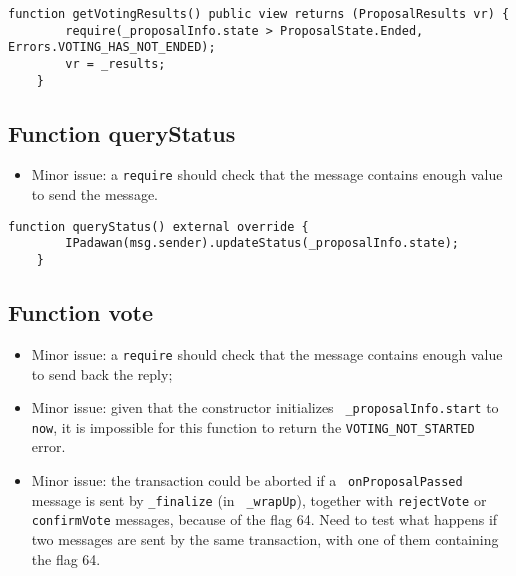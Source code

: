 \begin{lstlisting}[firstnumber=172]
    function getVotingResults() public view returns (ProposalResults vr) {
        require(_proposalInfo.state > ProposalState.Ended, Errors.VOTING_HAS_NOT_ENDED);
        vr = _results;
    }
\end{lstlisting}

\subsection{Function queryStatus}

\begin{itemize}
\item Minor issue: a {\tt require} should check that the message
  contains enough value to send the message.
\end{itemize}

\begin{lstlisting}[firstnumber=162]
    function queryStatus() external override {
        IPadawan(msg.sender).updateStatus(_proposalInfo.state);
    }
\end{lstlisting}

\subsection{Function vote}

\begin{itemize}
\item Minor issue: a {\tt require} should check that the message
  contains enough value to send back the reply;
\item Minor issue: given that the constructor initializes {\tt
  \_proposalInfo.start} to {\tt now}, it is impossible for this
  function to return the {\tt VOTING\_NOT\_STARTED} error.
\item Minor issue: the transaction could be aborted if a {\tt
  onProposalPassed} message is sent by {\tt \_finalize} (in {\tt
  \_wrapUp}), together with {\tt rejectVote} or {\tt confirmVote}
  messages, because of the flag 64.  Need to test what happens if two
  messages are sent by the same transaction, with one of them
  containing the flag 64.
\end{itemize}

